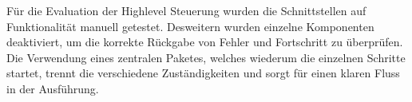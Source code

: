 Für die Evaluation der Highlevel Steuerung wurden die Schnittstellen auf Funktionalität manuell getestet. Desweitern wurden einzelne Komponenten deaktiviert, um die korrekte Rückgabe von Fehler und Fortschritt zu überprüfen. Die Verwendung eines zentralen Paketes, welches wiederum die einzelnen Schritte startet, trennt die verschiedene Zuständigkeiten und sorgt für einen klaren Fluss in der Ausführung.
